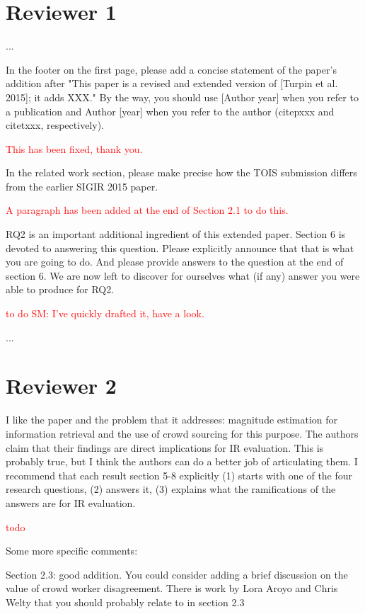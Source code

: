 \documentclass{article}
\newcommand{\comment}[1]{\vspace{1em} \textcolor{red}{{#1}} \vspace{1em}}
\begin{document}
\section{Reviewer 1}

...

In the footer on the first page, please add a concise statement of
the paper's addition after "This paper is a revised and extended
version of [Turpin et al. 2015]; it adds XXX." By the way, you
should use [Author year] when you refer to a publication and Author
[year] when you refer to the author (citep{xxx} and citet{xxx},
respectively).

\comment{This has been fixed, thank you.}

In the related work section, please make precise how the TOIS
submission differs from the earlier SIGIR 2015 paper.

\comment{A paragraph has been added at the end of Section 2.1 to do this.}

RQ2 is an important additional ingredient of this extended paper.
Section 6 is devoted to answering this question. Please explicitly
announce that that is what you are going to do. And please provide
answers to the question at the end of section 6. We are now left
to discover for ourselves what (if any) answer you were able to
produce for RQ2.

\comment{to do SM: I've quickly drafted it, have a look.}

\noindent ...


\section{Reviewer 2}

I like the paper and the problem that it addresses: magnitude
estimation for information retrieval and the use of crowd sourcing
for this purpose. The authors claim that their findings are direct
implications for IR evaluation. This is probably true, but I think
the authors can do a better job of articulating them. I recommend
that each result section 5-8 explicitly (1) starts with one of the
four research questions, (2) answers it, (3) explains what the
ramifications of the answers are for IR evaluation.

\comment {todo}

Some more specific comments:

Section 2.3: good addition. You could consider adding a brief
discussion on the value of crowd worker disagreement. There is work
by Lora Aroyo and Chris Welty that you should probably relate to
in section 2.3
\end{document}
